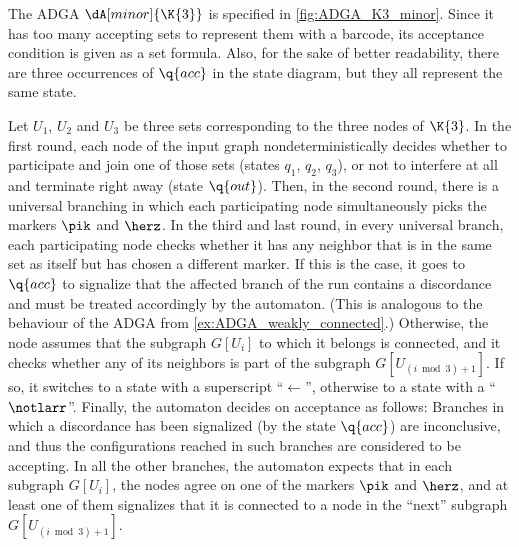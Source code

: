 \documentclass[a4paper,11pt,twoside]{report} \pdfoutput=1
\begin{document}
\begin{example}
  The ADGA $\dA[minor]{\K{3}}$ is specified in
  \cref{fig:ADGA_K3_minor}. Since it has too many accepting sets to
  represent them with a barcode, its acceptance condition is given as
  a set formula. Also, for the sake of better readability, there are
  three occurrences of $\q{acc}$ in the state diagram, but they all
  represent the same state.

  Let $U_1$, $U_2$ and $U_3$ be three sets corresponding to the three
  nodes of $\K{3}$. In the first round, each node of the input graph
  nondeterministically decides whether to participate and join one of
  those sets (states $q_1$, $q_2$, $q_3$), or not to interfere at all
  and terminate right away (state $\q{out}$). Then, in the second
  round, there is a universal branching in which each participating
  node simultaneously picks the markers $\pik$ and $\herz$. In the
  third and last round, in every universal branch, each participating
  node checks whether it has any neighbor that is in the same set as
  itself but has chosen a different marker. If this is the case, it
  goes to $\q{acc}$ to signalize that the affected branch of the run
  contains a discordance and must be treated accordingly by the
  automaton. (This is analogous to the behaviour of the ADGA from
  \cref{ex:ADGA_weakly_connected}.) Otherwise, the node assumes that
  the subgraph $G[U_i]$ to which it belongs is connected, and it
  checks whether any of its neighbors is part of the subgraph
  $G[U_{(i\bmod3)+1}]$. If so, it switches to a state with a
  superscript “$←$”, otherwise to a state with a
  “$\notlarr$”. Finally, the automaton decides on acceptance as
  follows: Branches in which a discordance has been signalized (by the
  state $\q{acc}$) are inconclusive, and thus the configurations
  reached in such branches are considered to be accepting. In all the
  other branches, the automaton expects that in each subgraph
  $G[U_i]$, the nodes agree on one of the markers $\pik$ and $\herz$,
  and at least one of them signalizes that it is connected to a node
  in the “next” subgraph $G[U_{(i\bmod3)+1}]$.
\end{example}
\end{document}
